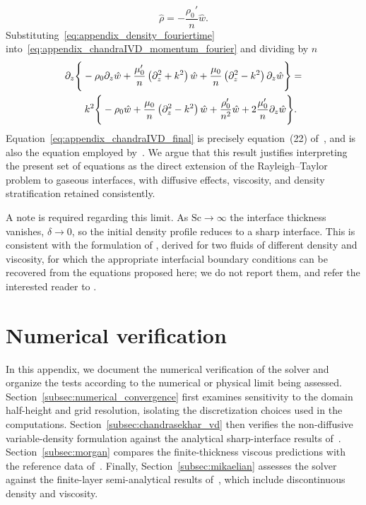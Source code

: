 \documentclass[11pt]{article}
\newcommand{\Sch}{\mathrm{Sc}}
\newenvironment{appen}{\appendix}{}
\begin{document}
\begin{appen}
\begin{equation}
    \label{eq:appendix_density_fouriertime}
    \hat{\rho}
    =
    -\frac{\rho_0'}{n}\hat{w}.
\end{equation}
Substituting~\eqref{eq:appendix_density_fouriertime} into~\eqref{eq:appendix_chandraIVD_momentum_fourier} and dividing by \(n\) 
\begin{align}
    \label{eq:appendix_chandraIVD_final}
    &\partial_z
    \Bigg\{
        -\rho_0
        \partial_z \hat{w}
        +
        \frac{\mu_0'}{n}
        \left(
            \partial_z^2 + k^2
        \right)\hat{w}
        +
        \frac{\mu_0}{n}
        \left(
            \partial_z^2 - k^2
        \right)
        \partial_z \hat{w}
    \Bigg\}
    =
    \notag\\
    &\qquad
    k^2
    \Bigg\{
        -\rho_0 \hat{w}
        +
        \frac{\mu_0}{n}
        \left(
            \partial_z^2 - k^2
        \right)\hat{w}
        +
        \frac{\rho_0'}{n^2}\hat{w}
        +
        2\frac{\mu_0'}{n}
        \partial_z \hat{w}
    \Bigg\}.
\end{align}
Equation~\eqref{eq:appendix_chandraIVD_final} is precisely equation~(22) of~\citet{chandrasekhar-1961}, and is also the equation employed by~\citet{morgan-likhachev-jacobs-2016}. We argue that this result justifies interpreting the present set of equations as the direct extension of the Rayleigh--Taylor problem to gaseous interfaces, with diffusive effects, viscosity, and density stratification retained consistently.

A note is required regarding this limit. As \(\Sch\to\infty\) the interface thickness vanishes, \(\delta\to0\), so the initial density profile reduces to a sharp interface. This is consistent with the formulation of \citet{chandrasekhar-1961}, derived for two fluids of different density and viscosity, for which the appropriate interfacial boundary conditions can be recovered from the equations proposed here; we do not report them, and refer the interested reader to \citet{chandrasekhar-1961}.


\section{Numerical verification}
\label{sec:appendix_numerical_verification}

In this appendix, we document the numerical verification of the solver and organize the tests according to the numerical or physical limit being assessed. Section~\ref{subsec:numerical_convergence} first examines sensitivity to the domain half-height and grid resolution, isolating the discretization choices used in the computations. Section~\ref{subsec:chandrasekhar_vd} then verifies the non-diffusive variable-density formulation against the analytical sharp-interface results of~\citet{chandrasekhar-1961}. Section~\ref{subsec:morgan} compares the finite-thickness viscous predictions with the reference data of~\citet{morgan-likhachev-jacobs-2016}. Finally, Section~\ref{subsec:mikaelian} assesses the solver against the finite-layer semi-analytical results of~\citet{mikaelian-1996}, which include discontinuous density and viscosity.


\end{appen}
\end{document}
